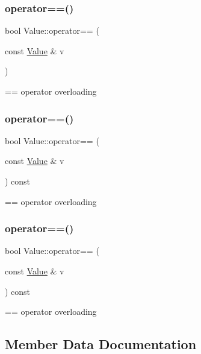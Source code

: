 \subsubsection{\texorpdfstring{operator==()}{operator==()}\hspace{0.1cm}{\footnotesize\ttfamily [2/4]}}
{\footnotesize\ttfamily bool Value\+::operator== (\begin{DoxyParamCaption}\item[{const \hyperlink{classValue}{Value} \&}]{v }\end{DoxyParamCaption})}

== operator overloading \mbox{\label{classValue_a9d9a4e78b513f3711060a5adeb044063}} 
\subsubsection{\texorpdfstring{operator==()}{operator==()}\hspace{0.1cm}{\footnotesize\ttfamily [3/4]}}
{\footnotesize\ttfamily bool Value\+::operator== (\begin{DoxyParamCaption}\item[{const \hyperlink{classValue}{Value} \&}]{v }\end{DoxyParamCaption}) const}

== operator overloading \mbox{\label{classValue_a9d9a4e78b513f3711060a5adeb044063}} 
\subsubsection{\texorpdfstring{operator==()}{operator==()}\hspace{0.1cm}{\footnotesize\ttfamily [4/4]}}
{\footnotesize\ttfamily bool Value\+::operator== (\begin{DoxyParamCaption}\item[{const \hyperlink{classValue}{Value} \&}]{v }\end{DoxyParamCaption}) const}

== operator overloading 

\subsection{Member Data Documentation}
\mbox{\label{classValue_af01b27b1c6ca5f4577a4b6c10a186f59}} 
